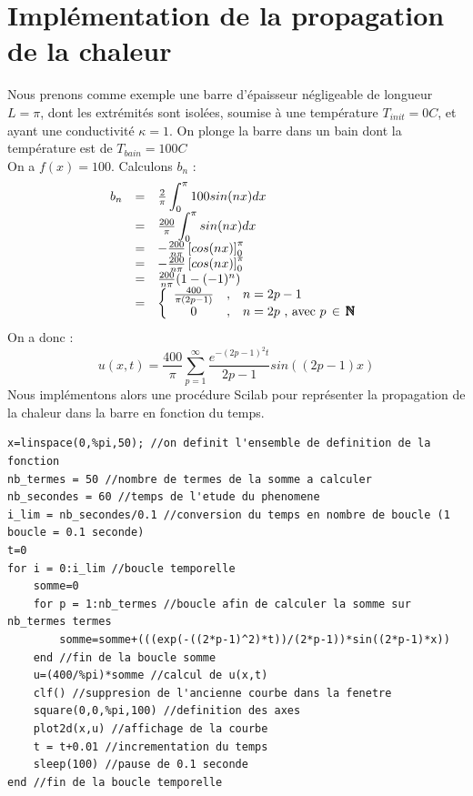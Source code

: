 \documentclass[a4paper,12pt]{report}
\begin{document}
\section{Impl\'ementation de la propagation de la chaleur}
Nous prenons comme exemple une barre d'\'epaisseur n\'egligeable de longueur $L = \pi$, dont les extr\'emit\'es sont isol\'ees, soumise \`a une temp\'erature $T_{init}=0$\degre$C$, et ayant une conductivit\'e $\kappa = 1$. On plonge la barre dans un bain dont la temp\'erature est de $T_{bain}=100$\degre$C$\\
On a $f(x)=100$. Calculons $b_{n}$ :
\[ 
  \begin{array}{l c l}
  b_{n} &=& \frac{2}{\pi}\displaystyle\int_{0}^{\pi}100sin(nx)dx\\
  &=& \frac{200}{\pi}\displaystyle\int_{0}^{\pi}sin(nx)dx\\
  &=& -\frac{200}{n\pi}\left[cos(nx)\right]_{0}^{\pi}\\
  &=& -\frac{200}{n\pi}\left[cos(nx)\right]_{0}^{\pi}\\
  &=& \frac{200}{n\pi}(1-(-1)^{n})\\
  &=& \left\{
  \begin{array}{c c l}
  \frac{400}{\pi(2p-1)} &,& n=2p-1\\
  0 &,& n=2p\text{ , avec }p\,\in\,\pmb{\mathbb{N}}\\
  \end{array}
\right.
  \end{array}
\]
On a donc :
\begin{equation}
u(x,t) = \frac{400}{\pi}\sum_{p=1}^{\infty}\frac{e^{-(2p-1)^{2}t}}{2p-1}sin((2p-1)x)
\end{equation}
Nous impl\'ementons alors une proc\'edure Scilab pour repr\'esenter la propagation de la chaleur dans la barre en fonction du temps.\\
\begin{lstlisting}
x=linspace(0,%pi,50); //on definit l'ensemble de definition de la fonction
nb_termes = 50 //nombre de termes de la somme a calculer
nb_secondes = 60 //temps de l'etude du phenomene
i_lim = nb_secondes/0.1 //conversion du temps en nombre de boucle (1 boucle = 0.1 seconde)
t=0
for i = 0:i_lim //boucle temporelle
    somme=0
    for p = 1:nb_termes //boucle afin de calculer la somme sur nb_termes termes
        somme=somme+(((exp(-((2*p-1)^2)*t))/(2*p-1))*sin((2*p-1)*x))
    end //fin de la boucle somme
    u=(400/%pi)*somme //calcul de u(x,t)
    clf() //suppresion de l'ancienne courbe dans la fenetre
    square(0,0,%pi,100) //definition des axes
    plot2d(x,u) //affichage de la courbe
    t = t+0.01 //incrementation du temps
    sleep(100) //pause de 0.1 seconde
end //fin de la boucle temporelle
\end{lstlisting}
\end{document}
